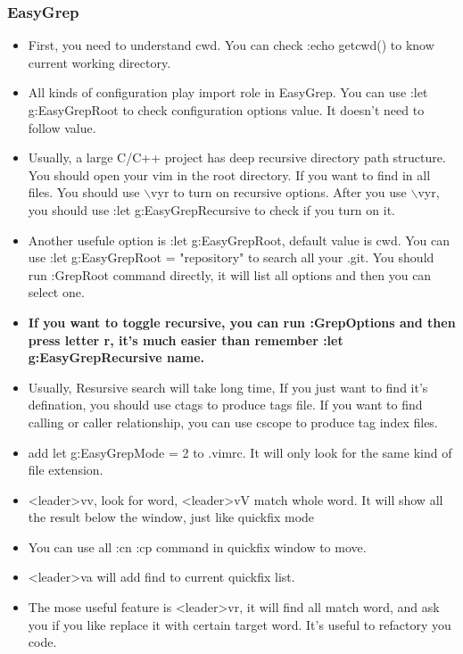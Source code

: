 \documentclass[a4paper,12pt,twoside]{book}
\begin{document}
\subsubsection{EasyGrep}
\begin{itemize}
		\item First, you need to understand cwd. You can check :echo getcwd() to know current working directory. 

		\item All kinds of configuration play import role in EasyGrep. You can use :let g:EasyGrepRoot to check configuration options value. It doesn't need to follow value.

		\item Usually, a large C/C++ project has deep recursive directory path structure. You should open your vim in the root directory. If you want to find in all files. You should use $\backslash$vyr to turn on recursive options. After you use $\backslash$vyr, you should use :let g:EasyGrepRecursive to check if you turn on it.

		\item Another usefule option is :let g:EasyGrepRoot, default value is cwd. You can use :let g:EasyGrepRoot = "repository" to search all your .git.  You should run :GrepRoot command directly, it will list all options and then you can select one.

		\item \textbf{If you want to toggle recursive, you can run :GrepOptions and then press letter r, it's much easier than remember :let g:EasyGrepRecursive name.} 

		\item Usually, Resursive search will take long time, If you just want to find it's defination, you should use ctags to produce tags file. If you want to find calling or caller relationship, you can use cscope to produce tag index files. 

		\item add let g:EasyGrepMode = 2 to .vimrc. It will only look for the same kind of file extension. 

		\item <leader>vv, look for word,  <leader>vV match whole word. It will show all the result below the window, just like quickfix mode

		\item You can use all :cn :cp command in quickfix window to move. 

		\item <leader>va will add find to current quickfix list. 

		\item The mose useful feature is <leader>vr, it will find all match word, and ask you if you like replace it with certain target word. It's useful to refactory you code. 
\end{itemize}
\end{document}

